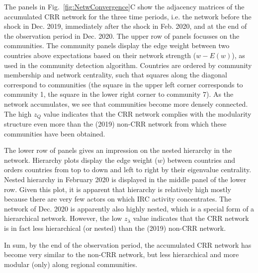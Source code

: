 The panels in Fig.~\ref{fig:NetwConvergence}C show the adjacency matrices of the accumulated CRR network for the three time periods, i.e. the network before the shock in Dec. 2019, immediately after the shock in Feb. 2020, and at the end of the observation period in Dec. 2020. The upper row of panels focusses on the communities. The community panels display the edge weight between two countries above expectations based on their network strength ($w - E(w)$), as used in the community detection algorithm. Countries are ordered by community membership and network centrality, such that squares along the diagonal correspond to communities (the square in the upper left corner corresponds to community 1, the square in the lower right corner to community 7). As the network accumulates, we see that communities become more densely connected. The high $z_Q$ value indicates that the CRR network complies with the modularity structure even more than the (2019) non-CRR network from which these communities have been obtained. 

The lower row of panels gives an impression on the nested hierarchy in the network. Hierarchy plots display the edge weight ($w$) between countries and orders countries from top to down and left to right by their eigenvalue centrality. Nested hierarchy in February 2020 is displayed in the middle panel of the lower row. Given this plot, it is apparent that hierarchy is relatively high mostly because there are very few actors on which IRC activity concentrates. The network of Dec. 2020 is apparently also highly nested, which is a special form of a hierarchical network. However, the low $z_\lambda$ value indicates that the CRR network is in fact less hierarchical (or nested) than the (2019) non-CRR network. 

In sum, by the end of the observation period, the accumulated CRR network has become very similar to the non-CRR network, but less hierarchical and more modular (only) along regional communities. 




